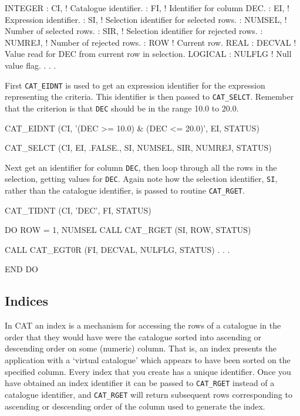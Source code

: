 \documentclass[11pt,twoside]{starlink}
\begin{document}
\begin{terminalv}
      INTEGER
     :  CI,      ! Catalogue identifier.
     :  FI,      ! Identifier for column DEC.
     :  EI,      ! Expression identifier.
     :  SI,      ! Selection identifier for selected rows.
     :  NUMSEL,  ! Number of selected rows.
     :  SIR,     ! Selection identifier for rejected rows.
     :  NUMREJ,  ! Number of rejected rows.
     :  ROW      ! Current row.
      REAL
     :  DECVAL   ! Value read for DEC from current row in selection.
      LOGICAL
     :  NULFLG   ! Null value flag.
       .
       .
       .
\end{terminalv}

First \texttt{CAT\_EIDNT} is used to get an expression identifier for the
expression representing the criteria.  This identifier is then passed
to \texttt{CAT\_SELCT}. Remember that the criterion is that \texttt{DEC}
should be in the range 10.0 to 20.0.

\begin{terminalv}
      CAT_EIDNT (CI, '(DEC >= 10.0) & (DEC <= 20.0)', EI, STATUS)

      CAT_SELCT (CI, EI, .FALSE., SI, NUMSEL, SIR, NUMREJ, STATUS)
\end{terminalv}

Next get an identifier for column \texttt{DEC}, then loop through all the
rows in the selection, getting values for \texttt{DEC}.  Again note how the
selection identifier, \texttt{SI}, rather than the catalogue identifier,
is passed to routine \texttt{CAT\_RGET}.

\begin{terminalv}
      CAT_TIDNT (CI, 'DEC', FI, STATUS)

      DO ROW = 1, NUMSEL
         CALL CAT_RGET (SI, ROW, STATUS)

         CALL CAT_EGT0R (FI, DECVAL, NULFLG, STATUS)
           .
           .
           .

      END DO
\end{terminalv}


\subsection{Indices}

In CAT an index is a mechanism for accessing the rows of a catalogue in
the order that they would have were the catalogue sorted into ascending
or descending order on some (numeric) column. That is, an index presents
the application with a `virtual catalogue' which appears to have been
sorted on the specified column. Every index that you create has a unique
identifier. Once you have obtained an index identifier it can be passed to
\texttt{CAT\_RGET} instead of a catalogue identifier, and \texttt{CAT\_RGET} will return subsequent rows corresponding to ascending or
descending order of the column used to generate the index.
\end{document}
